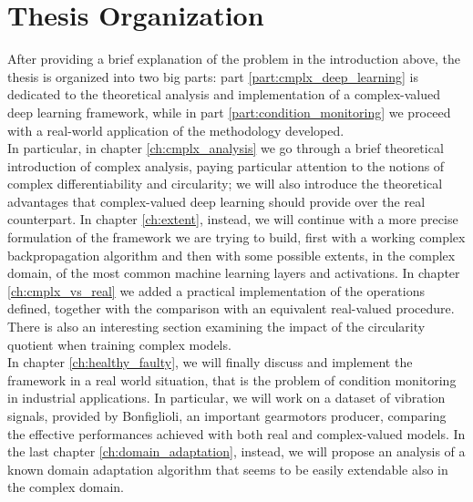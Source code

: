 \documentclass[../main.tex]{subfiles}
\begin{document}
\section{Thesis Organization}

After providing a brief explanation of the problem in the introduction above, the thesis is organized into two big parts: part \ref{part:cmplx_deep_learning} is dedicated to the theoretical analysis and implementation of a complex-valued deep learning framework, while in part \ref{part:condition_monitoring} we proceed with a real-world application of the methodology developed.\\
In particular, in chapter \ref{ch:cmplx_analysis} we go through a brief theoretical introduction of complex analysis, paying particular attention to the notions of complex differentiability and circularity; we will also introduce the theoretical advantages that complex-valued deep learning should provide over the real counterpart. In chapter \ref{ch:extent}, instead, we will continue with a more precise formulation of the framework we are trying to build, first with a working complex backpropagation algorithm and then with some possible extents, in the complex domain, of the most common machine learning layers and activations. In chapter \ref{ch:cmplx_vs_real} we added a practical implementation of the operations defined, together with the comparison with an equivalent real-valued procedure. There is also an interesting section examining the impact of the circularity quotient when training complex models.\\
In chapter \ref{ch:healthy_faulty}, we will finally discuss and implement the framework in a real world situation, that is the problem of condition monitoring in industrial applications. In particular, we will work on a dataset of vibration signals, provided by Bonfiglioli, an  important gearmotors producer, comparing the effective performances achieved with both real and complex-valued models. In the last chapter \ref{ch:domain_adaptation}, instead, we will propose an analysis of a known domain adaptation algorithm that seems to be easily extendable also in the complex domain.
\end{document}
